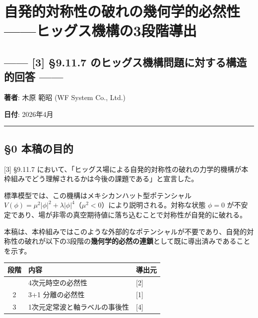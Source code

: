 \documentclass[
  a4paper,11pt]{ltjsarticle}
\author{}
\date{}
\newcounter{none} %
\begin{document}
\section{自発的対称性の破れの幾何学的必然性------ヒッグス機構の3段階導出}\label{ux81eaux767aux7684ux5bfeux79f0ux6027ux306eux7834ux308cux306eux5e7eux4f55ux5b66ux7684ux5fc5ux7136ux6027ux30d2ux30c3ux30b0ux30b9ux6a5fux69cbux306e3ux6bb5ux968eux5c0eux51fa}

\subsection{------ {[}3{]} §9.11.7 のヒッグス機構問題に対する構造的回答
------}\label{ux306eux30d2ux30c3ux30b0ux30b9ux6a5fux69cbux554fux984cux306bux5bfeux3059ux308bux69cbux9020ux7684ux56deux7b54}

\textbf{著者}: 木原 範昭 (WF System Co., Ltd.)

\textbf{日付}: 2026年4月

\begin{center}\rule{0.5\linewidth}{0.5pt}\end{center}

\subsection{§0 本稿の目的}\label{ux672cux7a3fux306eux76eeux7684}

{[}3{]} §9.11.7
において、「ヒッグス場による自発的対称性の破れの力学的機構が本枠組みでどう理解されるかは今後の課題である」と宣言した。

標準模型では、この機構はメキシカンハット型ポテンシャル
\(V(\phi) = \mu^2 |\phi|^2 + \lambda |\phi|^4\)（\(\mu^2 < 0\)）により説明される。対称な状態
\(\phi = 0\)
が不安定であり、場が非零の真空期待値に落ち込むことで対称性が自発的に破れる。

本稿は、本枠組みではこのような外部的なポテンシャルが不要であり、自発的対称性の破れが以下の3段階の\textbf{幾何学的必然の連鎖}として既に導出済みであることを示す。

{\def\LTcaptype{none} %
\begin{longtable}[]{@{}cll@{}}
\toprule\noalign{}
段階 & 内容 & 導出元 \\
\midrule\noalign{}
\endhead
\bottomrule\noalign{}
\endlastfoot
1 & 4次元時空の必然性 & {[}2{]} \\
2 & 3+1 分離の必然性 & {[}1{]} \\
3 & 1次元定常波と軸ラベルの事後性 & {[}4{]} \\
\end{longtable}
}
\end{document}
